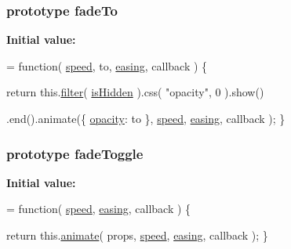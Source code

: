 \subsubsection[{fade\+To}]{ {\bf prototype} fade\+To}\label{jquery-1_810_82-vsdoc_8js_a3e1ca57624879f2353f88a9b747aa8dc}
{\bfseries Initial value\+:}
\begin{DoxyCode}
= \textcolor{keyword}{function}( \hyperlink{jquery-1_810_82-vsdoc_8js_add98c90065e6563cba26ff6d2016c46c}{speed}, to, \hyperlink{jquery-1_810_82-vsdoc_8js_a9758a312629fa6de1744280dd6e6253b}{easing}, callback ) \{



        
        \textcolor{keywordflow}{return} this.\hyperlink{jquery-1_810_82-vsdoc_8js_ac99d0cf56cab46114f5765a14e03ad6d}{filter}( \hyperlink{_bibabook_2_scripts_2jquery-1_810_82_8js_a67ed58d688ff11991ca2826ebfbf28a4}{isHidden} ).css( \textcolor{stringliteral}{"opacity"}, 0 ).show()

            
            .end().animate(\{ \hyperlink{_bibabook_2_scripts_2jquery-1_810_82_8min_8js_a328c19d9255bfd09a2f3cddecadca6ad}{opacity}: to \}, \hyperlink{jquery-1_810_82-vsdoc_8js_add98c90065e6563cba26ff6d2016c46c}{speed}, \hyperlink{jquery-1_810_82-vsdoc_8js_a9758a312629fa6de1744280dd6e6253b}{easing}, callback );
    \}
\end{DoxyCode}
\hypertarget{jquery-1_810_82-vsdoc_8js_ada46ab8667c3108cbdaf50446d41cc59}{}
\subsubsection[{fade\+Toggle}]{ {\bf prototype} fade\+Toggle}\label{jquery-1_810_82-vsdoc_8js_ada46ab8667c3108cbdaf50446d41cc59}
{\bfseries Initial value\+:}
\begin{DoxyCode}
= \textcolor{keyword}{function}( \hyperlink{jquery-1_810_82-vsdoc_8js_add98c90065e6563cba26ff6d2016c46c}{speed}, \hyperlink{jquery-1_810_82-vsdoc_8js_a9758a312629fa6de1744280dd6e6253b}{easing}, callback ) \{


        \textcolor{keywordflow}{return} this.\hyperlink{jquery-1_810_82-vsdoc_8js_a956a1d08128d41115c45b6815814a64d}{animate}( props, \hyperlink{jquery-1_810_82-vsdoc_8js_add98c90065e6563cba26ff6d2016c46c}{speed}, \hyperlink{jquery-1_810_82-vsdoc_8js_a9758a312629fa6de1744280dd6e6253b}{easing}, callback );
    \}
\end{DoxyCode}
\hypertarget{jquery-1_810_82-vsdoc_8js_ac99d0cf56cab46114f5765a14e03ad6d}{}
